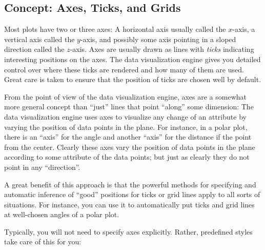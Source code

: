 \subsection{Concept: Axes, Ticks, and Grids}

Most plots have two or three axes: A horizontal axis usually called the
$x$-axis, a vertical axis called the $y$-axis, and possibly some axis pointing
in a sloped direction called the $z$-axis. Axes are usually drawn as lines with
\emph{ticks} indicating interesting positions on the axes. The data
visualization engine gives you detailed control over where these ticks are
rendered and how many of them are used. Great care is taken to ensure that the
position of ticks are chosen well by default.

From the point of view of the data visualization engine, axes are a somewhat
more general concept than ``just'' lines that point ``along'' some dimension:
The data visualization engine uses axes to visualize any change of an attribute
by varying the position of data points in the plane. For instance, in a polar
plot, there is an ``axis'' for the angle and another ``axis'' for the distance
if the point from the center. Clearly these axes vary the position of data
points in the plane according to some attribute of the data points; but just as
clearly they do not point in any ``direction''.

A great benefit of this approach is that the powerful methods for specifying
and automatic inference of ``good'' positions for ticks or grid lines apply to
all sorts of situations. For instance, you can use it to automatically put
ticks and grid lines at well-chosen angles of a polar plot.

Typically, you will not need to specify axes explicitly. Rather, predefined
styles take care of this for you:
%
\begin{codeexample}[preamble={\usetikzlibrary{datavisualization.formats.functions}}]
\end{codeexample}

\begin{codeexample}[preamble={\usetikzlibrary{datavisualization.formats.functions}}]
\end{codeexample}

